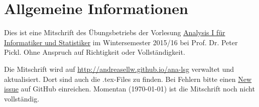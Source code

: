 \chapter*{Allgemeine Informationen}
Dies ist eine Mitschrift des Übungsbetriebs der Vorlesung
\href{http://www.mathematik.uni-muenchen.de/~nissen/analysis2015/}{Analysis I für Informatiker und Statistiker}
im Wintersemester 2015/16 bei Prof. Dr. Peter Pickl. Ohne Anspruch auf Richtigkeit oder Vollständigkeit.\par
Die Mitschrift wird auf \href{http://andreasellw.github.io/ana-lsg}{http://andreasellw.github.io/ana-lsg} verwaltet und aktualisiert. Dort sind auch die .tex-Files zu finden. Bei Fehlern bitte einen \href{https://github.com/andreasellw/ana-lsg/issues}{New issue} auf GitHub einreichen. Momentan (\today) ist die Mitschrift noch nicht vollständig.
